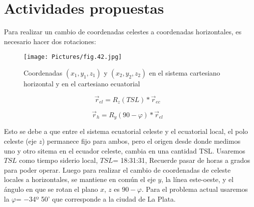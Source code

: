 



\section{Actividades propuestas}
\begin{answers}
Para realizar un cambio de coordenadas celestes a coordenadas horizontales, es necesario hacer dos rotaciones:


\begin{figure}
    \centering
    \texttt{[image: Pictures/fig.42.jpg]}
    \caption{Coordenadas $(x_1, y_1, z_1)$ y $(x_2, y_2, z_2)$ en el sistema cartesiano  horizontal y en el cartesiano  ecuatorial}
    \label{Esfera}
\end{figure}


$$\vec{r}_{el}= R_z(TSL)*\vec{r}_{ec}$$

$$\vec{r}_{h}= R_y(90-\varphi)*\vec{r}_{el}$$

Esto se debe a que entre el sistema ecuatorial celeste y el ecuatorial local, el polo celeste (eje $z$) permanece  fijo para ambos, pero el origen desde donde medimos uno y otro sitema en el ecuador celeste, cambia en una cantidad TSL. Usaremos $TSL$ como tiempo siderio local, $TSL$= 18:31:31, Recuerde pasar de horas a grados para poder operar. Luego para realizar el cambio de coordenadas de celeste locales a horizontales, se mantiene en común el eje $y$, la línea este-oeste, y el ángulo en que se rotan el plano $x$, $z$ es $90-\varphi$. Para el problema actual usaremos la $\varphi$= $-$34º 50'  que corresponde a la ciudad de La Plata.


\end{answers}
